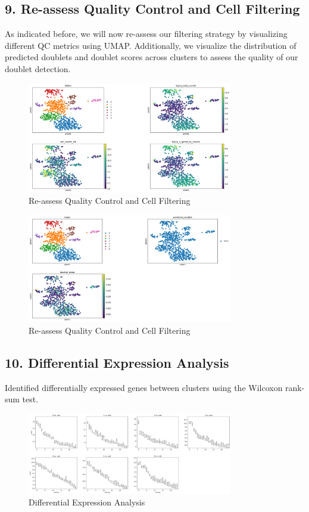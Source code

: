 \documentclass[12pt]{article}
\begin{document}
\subsection{9. Re-assess Quality Control and Cell Filtering}
As indicated before, we will now re-assess our filtering strategy by visualizing different QC metrics using UMAP. Additionally, we visualize the distribution of predicted doublets and doublet scores across clusters to assess the quality of our doublet detection.

\begin{figure}[H]
    \centering
    \includegraphics[width=0.8\textwidth]{umap_qc.png}
    \caption{Re-assess Quality Control and Cell Filtering}
    \label{fig:umap_qc}
\end{figure}

\begin{figure}[H]
    \centering
    \includegraphics[width=0.8\textwidth]{umap_doublets_qc.png}
    \caption{Re-assess Quality Control and Cell Filtering}
    \label{fig:umap_doublets_qc}
\end{figure}

\subsection{10. Differential Expression Analysis}
Identified differentially expressed genes between clusters using the Wilcoxon rank-sum test.

\begin{figure}[H]
    \centering
    \includegraphics[width=0.8\textwidth]{de.png}
    \caption{Differential Expression Analysis}
    \label{fig:de}
\end{figure}
\end{document}
